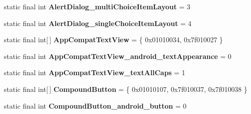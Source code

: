 \begin{DoxyCompactItemize}
\item 
\hypertarget{classandroid_1_1support_1_1v7_1_1appcompat_1_1_r_1_1styleable_ae1e8a669920f8a567b5f718033319753}{}static final int {\bfseries Alert\+Dialog\+\_\+multi\+Choice\+Item\+Layout} = 3\label{classandroid_1_1support_1_1v7_1_1appcompat_1_1_r_1_1styleable_ae1e8a669920f8a567b5f718033319753}

\item 
\hypertarget{classandroid_1_1support_1_1v7_1_1appcompat_1_1_r_1_1styleable_a9e188e09ee3e99d0885738d1480b0d1e}{}static final int {\bfseries Alert\+Dialog\+\_\+single\+Choice\+Item\+Layout} = 4\label{classandroid_1_1support_1_1v7_1_1appcompat_1_1_r_1_1styleable_a9e188e09ee3e99d0885738d1480b0d1e}

\item 
\hypertarget{classandroid_1_1support_1_1v7_1_1appcompat_1_1_r_1_1styleable_a87384e67b6e421e7c07536d9afe8d185}{}static final int\mbox{[}$\,$\mbox{]} {\bfseries App\+Compat\+Text\+View} = \{ 0x01010034, 0x7f010027 \}\label{classandroid_1_1support_1_1v7_1_1appcompat_1_1_r_1_1styleable_a87384e67b6e421e7c07536d9afe8d185}

\item 
\hypertarget{classandroid_1_1support_1_1v7_1_1appcompat_1_1_r_1_1styleable_a3ce93dcbd8fd4d957a09de9dde780dca}{}static final int {\bfseries App\+Compat\+Text\+View\+\_\+android\+\_\+text\+Appearance} = 0\label{classandroid_1_1support_1_1v7_1_1appcompat_1_1_r_1_1styleable_a3ce93dcbd8fd4d957a09de9dde780dca}

\item 
\hypertarget{classandroid_1_1support_1_1v7_1_1appcompat_1_1_r_1_1styleable_a25380302d2eae707e18a64b87eb2d4aa}{}static final int {\bfseries App\+Compat\+Text\+View\+\_\+text\+All\+Caps} = 1\label{classandroid_1_1support_1_1v7_1_1appcompat_1_1_r_1_1styleable_a25380302d2eae707e18a64b87eb2d4aa}

\item 
\hypertarget{classandroid_1_1support_1_1v7_1_1appcompat_1_1_r_1_1styleable_aa66e991e0d5dc9db5a9048c91817235f}{}static final int\mbox{[}$\,$\mbox{]} {\bfseries Compound\+Button} = \{ 0x01010107, 0x7f010037, 0x7f010038 \}\label{classandroid_1_1support_1_1v7_1_1appcompat_1_1_r_1_1styleable_aa66e991e0d5dc9db5a9048c91817235f}

\item 
\hypertarget{classandroid_1_1support_1_1v7_1_1appcompat_1_1_r_1_1styleable_a63a32142a434a35b617a20d37de7309b}{}static final int {\bfseries Compound\+Button\+\_\+android\+\_\+button} = 0\label{classandroid_1_1support_1_1v7_1_1appcompat_1_1_r_1_1styleable_a63a32142a434a35b617a20d37de7309b}


\end{DoxyCompactItemize}
